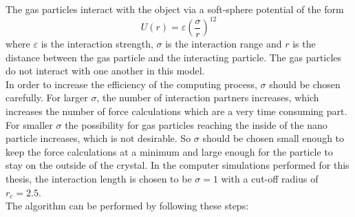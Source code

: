 \documentclass[12pt]{article}
\begin{document}
The gas particles interact with the object via a soft-sphere potential of the form
\begin{equation}
    \label{eq:softsphere}
    U(r) = \varepsilon \left(\frac{\sigma}{r}\right)^{12}
\end{equation}
where $\varepsilon$ is the interaction strength, $\sigma$ is the interaction range and $r$ is the distance between the gas particle and the
interacting particle. The gas particles do not interact with one another in this model.\\
In order to increase the efficiency of the computing process, $\sigma$ should be chosen carefully. For larger $\sigma$, the number of interaction
partners increases, which increases the number of force calculations which are a very time consuming part. For smaller $\sigma$ the possibility for
gas particles reaching the inside of the nano particle increases, which is not desirable. So $\sigma$ should be chosen small enough to keep the force
calculations at a minimum and large enough for the particle to stay on the outside of the crystal. In the computer simulations performed for this
thesis, the interaction length is chosen to be $\sigma = 1$ with a cut-off radius of $r_c = 2.5$.\\ 
The algorithm can be performed by following these steps:
\end{document}
